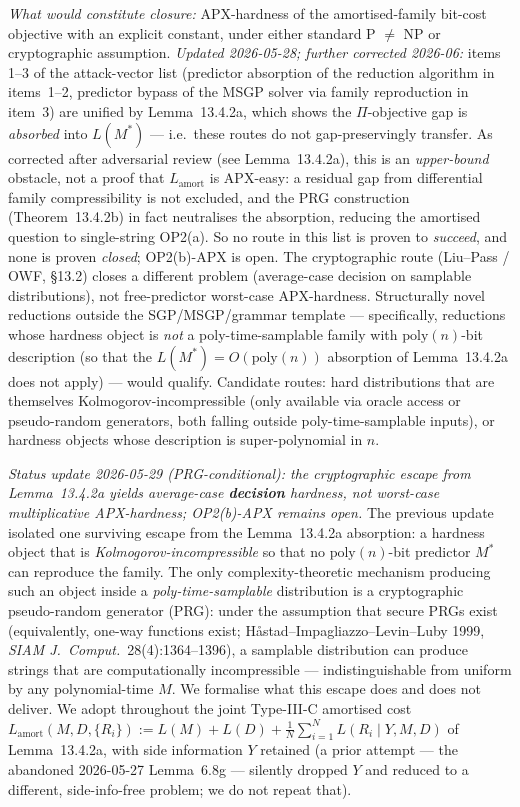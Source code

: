 \documentclass[
]{article}
\begin{document}
\emph{What would constitute closure:} APX-hardness of the
amortised-family bit-cost objective with an explicit constant,
under either standard P $\neq$ NP or cryptographic assumption.
\emph{Updated 2026-05-28; further corrected 2026-06:} items 1--3
of the attack-vector list (predictor absorption of the reduction
algorithm in items~1--2, predictor bypass of the MSGP solver via
family reproduction in item~3) are unified by Lemma~13.4.2a, which
shows the $\Pi$-objective gap is \emph{absorbed} into $L(M^*)$ ---
i.e.\ these routes do not gap-preservingly transfer. As corrected
after adversarial review (see Lemma~13.4.2a), this is an
\emph{upper-bound} obstacle, not a proof that $L_{\mathrm{amort}}$
is APX-easy: a residual gap from differential family
compressibility is not excluded, and the PRG construction
(Theorem~13.4.2b) in fact neutralises the absorption, reducing the
amortised question to single-string OP2(a). So no route in this
list is proven to \emph{succeed}, and none is proven \emph{closed};
OP2(b)-APX is open.
The cryptographic route (Liu--Pass / OWF, §13.2) closes a
different problem (average-case decision on samplable distributions),
not free-predictor worst-case APX-hardness. Structurally novel
reductions outside the SGP/MSGP/grammar template --- specifically,
reductions whose hardness object is \emph{not} a poly-time-samplable
family with $\mathrm{poly}(n)$-bit description (so that the
$L(M^*) = O(\mathrm{poly}(n))$ absorption of Lemma~13.4.2a does
not apply) --- would qualify. Candidate routes: hard distributions
that are themselves Kolmogorov-incompressible (only available via
oracle access or pseudo-random generators, both falling outside
poly-time-samplable inputs), or hardness objects whose description
is super-polynomial in $n$.

\emph{Status update 2026-05-29 (PRG-conditional): the cryptographic
escape from Lemma~13.4.2a yields average-case \textbf{decision}
hardness, not worst-case multiplicative APX-hardness; OP2(b)-APX
remains open.} The previous update isolated one surviving escape from
the Lemma~13.4.2a absorption: a hardness object that is
\emph{Kolmogorov-incompressible} so that no $\mathrm{poly}(n)$-bit
predictor $M^*$ can reproduce the family. The only complexity-theoretic
mechanism producing such an object inside a \emph{poly-time-samplable}
distribution is a cryptographic pseudo-random generator (PRG): under
the assumption that secure PRGs exist (equivalently, one-way functions
exist; H{\aa}stad--Impagliazzo--Levin--Luby 1999, \emph{SIAM J.\ Comput.}\
28(4):1364--1396), a samplable distribution can produce strings that
are computationally incompressible --- indistinguishable from uniform
by any polynomial-time $M$. We formalise what this escape does and does
not deliver. We adopt throughout the joint Type-III-C amortised cost
$L_{\mathrm{amort}}(M,D,\{R_i\}) := L(M)+L(D)+\frac1N\sum_{i=1}^N
L(R_i \mid Y, M, D)$ of Lemma~13.4.2a, with side information $Y$
retained (a prior attempt --- the abandoned 2026-05-27 Lemma~6.8g ---
silently dropped $Y$ and reduced to a different, side-info-free
problem; we do not repeat that).
\end{document}
